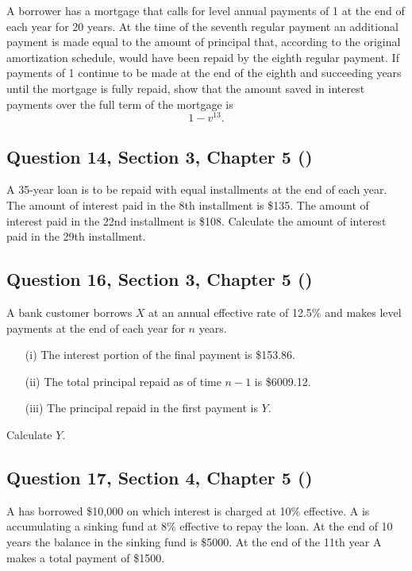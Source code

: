 \documentclass[12pt, a4paper]{article}
\begin{document}
\noindent A borrower has a mortgage that calls for level annual payments of 1 at the end of each year for 20 years. At the time of the seventh regular payment an additional payment is made equal to the amount of principal that, according to the original amortization schedule, would have been repaid by the eighth regular payment. If payments of 1 continue to be made at the end of the eighth and succeeding years until the mortgage is fully repaid, show that the amount saved in interest payments over the full term of the mortgage is
\[
1 - v^{13}.
\]

\subsection*{Question 14, Section 3, Chapter 5  (\cite{toi3rd})}

\noindent A 35-year loan is to be repaid with equal installments at the end of each year. The amount of interest paid in the 8th installment is \$135. The amount of interest paid in the 22nd installment is \$108. Calculate the amount of interest paid in the 29th installment.

\subsection*{Question 16, Section 3, Chapter 5  (\cite{toi3rd})}

\noindent A bank customer borrows \( X \) at an annual effective rate of 12.5\% and makes level payments at the end of each year for \( n \) years.

\begin{enumerate}
\item[(i)] The interest portion of the final payment is \$153.86.
\item[(ii)] The total principal repaid as of time \( n-1 \) is \$6009.12.
\item[(iii)] The principal repaid in the first payment is \( Y \).
\end{enumerate}
Calculate \( Y. \)

\subsection*{Question 17, Section 4, Chapter 5  (\cite{toi3rd})}

\noindent A has borrowed \$10{,}000 on which interest is charged at 10\% effective. A is accumulating a sinking fund at 8\% effective to repay the loan. At the end of 10 years the balance in the sinking fund is \$5000. At the end of the 11th year A makes a total payment of \$1500.
\end{document}
